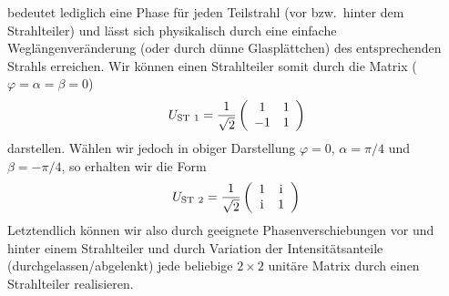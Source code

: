 bedeutet lediglich eine Phase f\"ur jeden Teilstrahl (vor bzw.\ hinter dem Strahlteiler) und l\"asst
sich physikalisch durch eine einfache Wegl\"angenver\"anderung (oder durch d\"unne Glaspl\"attchen)
des entsprechenden Strahls erreichen. Wir k\"onnen einen Strahlteiler somit durch die Matrix
($\varphi=\alpha=\beta=0$)
\begin{equation}
          U_{\rm ST~1} =  \frac{1}{\sqrt{2}}  \left( \begin{array}{cc}  1 & 1  \\ -1  & 1 \end{array} \right) 
\end{equation}
darstellen. W\"ahlen wir jedoch in obiger Darstellung $\varphi=0$, $\alpha = \pi/4$ und $\beta=-\pi/4$, so
erhalten wir die Form
\begin{equation}
          U_{\rm ST~2} =  \frac{1}{\sqrt{2}}  \left( \begin{array}{cc}  1 & {\rm i}  \\ {\rm i}  & 1 \end{array} \right) 
\end{equation}
Letztendlich k\"onnen wir also durch geeignete Phasenverschiebungen vor und hinter einem
Strahlteiler und durch Variation der Intensit\"atsanteile (durchgelassen/abgelenkt) jede beliebige 
$2\times 2$ unit\"are 
Matrix durch einen Strahlteiler realisieren.


%


